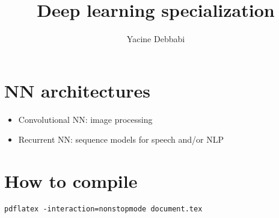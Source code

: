 \documentclass[]{article}
\title{\textbf{Deep learning specialization}}
\author{Yacine Debbabi}
\begin{document}
\maketitle

\tableofcontents

\section{NN architectures}

\begin{itemize}
\item Convolutional NN: image processing
\item Recurrent NN: sequence models for speech and/or NLP
\end{itemize}

\section{How to compile}

\begin{verbatim}
pdflatex -interaction=nonstopmode document.tex
\end{verbatim}
\end{document}
